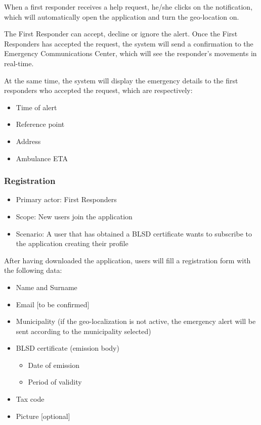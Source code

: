 \documentclass[11pt,a4paper]{article}
\begin{document}
When a first responder receives a help request, he/she clicks on the notification, which will automatically open the application and turn the geo-location on.

The First Responder can accept, decline or ignore the alert.
%
Once the First Responders has accepted the request, the system will send a confirmation to the Emergency Communications Center, which will see the responder's movements in real-time.

At the same time, the system will display the emergency details to the first responders who accepted the request, which are respectively:

\begin{itemize}
    \item Time of alert
    \item Reference point
    \item Address
    \item Ambulance ETA
\end{itemize}

\subsubsection*{Registration}

\begin{itemize}
    \item Primary actor: First Responders
    \item Scope: New users join the application
    \item Scenario: A user that has obtained a BLSD certificate wants to subscribe to the application creating their profile
\end{itemize}

After having downloaded the application, users will fill a registration form with the following data:

\begin{itemize}
    \item Name and Surname
    \item Email [to be confirmed]
    \item Municipality (if the geo-localization is not active, the emergency alert will be sent according to the municipality selected) 
    \item BLSD certificate (emission body)
    \begin{itemize}
        \item Date of emission
        \item Period of validity
    \end{itemize}
    \item Tax code
    \item Picture [optional]
\end{itemize}
\end{document}
